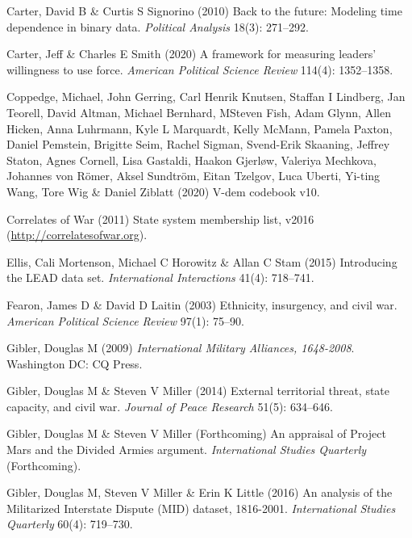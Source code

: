 \documentclass[
  11pt,
]{article}
\newlength{\cslhangindent}
\newenvironment{CSLReferences}[2] %
 {%
  \setlength{\parindent}{0pt}
  \ifodd #1 \everypar{\setlength{\hangindent}{\cslhangindent}}\ignorespaces\fi
  \ifnum #2 > 0
  \setlength{\parskip}{#2\baselineskip}
  \fi
 }%
 {}
\begin{document}
\begin{CSLReferences}{1}{0}
\leavevmode{}%
Carter, David B \& Curtis S Signorino (2010) Back to the future: Modeling time dependence in binary data. \emph{Political Analysis} 18(3): 271--292.

\leavevmode{}%
Carter, Jeff \& Charles E Smith (2020) A framework for measuring leaders' willingness to use force. \emph{American Political Science Review} 114(4): 1352--1358.

\leavevmode{}%
Coppedge, Michael, John Gerring, Carl Henrik Knutsen, Staffan I Lindberg, Jan Teorell, David Altman, Michael Bernhard, MSteven Fish, Adam Glynn, Allen Hicken, Anna Luhrmann, Kyle L Marquardt, Kelly McMann, Pamela Paxton, Daniel Pemstein, Brigitte Seim, Rachel Sigman, Svend-Erik Skaaning, Jeffrey Staton, Agnes Cornell, Lisa Gastaldi, Haakon Gjerløw, Valeriya Mechkova, Johannes von Römer, Aksel Sundtröm, Eitan Tzelgov, Luca Uberti, Yi-ting Wang, Tore Wig \& Daniel Ziblatt (2020) V-dem codebook v10.

\leavevmode{}%
Correlates of War (2011) State system membership list, v2016 (\url{http://correlatesofwar.org}).

\leavevmode{}%
Ellis, Cali Mortenson, Michael C Horowitz \& Allan C Stam (2015) Introducing the {LEAD} data set. \emph{International Interactions} 41(4): 718--741.

\leavevmode{}%
Fearon, James D \& David D Laitin (2003) Ethnicity, insurgency, and civil war. \emph{American Political Science Review} 97(1): 75--90.

\leavevmode{}%
Gibler, Douglas M (2009) \emph{International Military Alliances, 1648-2008}. Washington DC: CQ Press.

\leavevmode{}%
Gibler, Douglas M \& Steven V Miller (2014) External territorial threat, state capacity, and civil war. \emph{Journal of Peace Research} 51(5): 634--646.

\leavevmode{}%
Gibler, Douglas M \& Steven V Miller (Forthcoming) An appraisal of {P}roject {M}ars and the {D}ivided {A}rmies argument. \emph{International Studies Quarterly} (Forthcoming).

\leavevmode{}%
Gibler, Douglas M, Steven V Miller \& Erin K Little (2016) An analysis of the {M}ilitarized {I}nterstate {D}ispute {(MID)} dataset, 1816-2001. \emph{International Studies Quarterly} 60(4): 719--730.


\end{CSLReferences}
\end{document}

